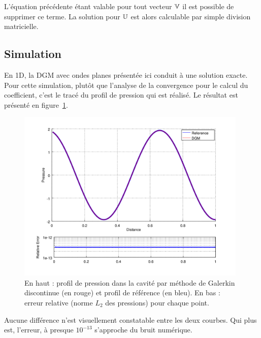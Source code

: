 L'équation précédente étant valable pour tout vecteur $\mathbb{V}$ il est possible de supprimer ce terme.
La solution pour $\mathbb{U}$ est alors calculable par simple division matricielle.

\subsection{Simulation}

En 1D, la DGM avec ondes planes présentée ici conduit à une solution exacte. Pour cette simulation, plutôt que l'analyse
de la convergence pour le calcul du coefficient, c'est le tracé du profil de pression qui est réalisé. Le résultat est
présenté en figure~\ref{fig:dgm:simul}.

\begin{figure}[!ht]
    \centering
    \includegraphics[width=11cm]{part2/figs/comp_hermiteFEM_dgm.png}
    \caption{\label{fig:dgm:simul}En haut : profil de pression dans la cavité par méthode de Galerkin discontinue (en rouge) et
    profil de référence (en bleu). En bas : erreur relative (norme $L_2$ des pressions) pour chaque point.}
\end{figure}

Aucune différence n'est visuellement constatable entre les deux courbes. Qui plus est, l'erreur, à presque $10^{-13}$
s'approche du bruit numérique.

